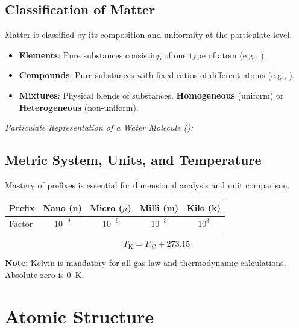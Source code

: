\documentclass[11pt]{article}
\begin{document}
\subsection{Classification of Matter}
Matter is classified by its composition and uniformity at the particulate level.
\begin{itemize}
    \item \textbf{Elements}: Pure substances consisting of one type of atom (e.g., ).
    \item \textbf{Compounds}: Pure substances with fixed ratios of different atoms (e.g., ).
    \item \textbf{Mixtures}: Physical blends of substances. \textbf{Homogeneous} (uniform) or \textbf{Heterogeneous} (non-uniform).
\end{itemize}
\begin{center}
    \textit{Particulate Representation of a Water Molecule ():} \\
    \vspace{0.5em}
\end{center}

\subsection{Metric System, Units, and Temperature}
Mastery of prefixes is essential for dimensional analysis and unit comparison.
\begin{table}[h]
    \centering
    \begin{tabular}{lcccc}
        \toprule
        Prefix & Nano (n) & Micro ($\mu$) & Milli (m) & Kilo (k) \\
        \midrule
        Factor & $10^{-9}$ & $10^{-6}$ & $10^{-3}$ & $10^{3}$ \\
        \bottomrule
    \end{tabular}
\end{table}

\begin{tcolorbox}[provided, title=Temperature Conversion (Provided)]
    \[ T_{\si{\kelvin}} = T_{^\circ\text{C}} + 273.15 \]
\end{tcolorbox}
\textbf{Note}: Kelvin is mandatory for all gas law and thermodynamic calculations. Absolute zero is \SI{0}{\kelvin}.

\newpage

\section{Atomic Structure}
\end{document}
